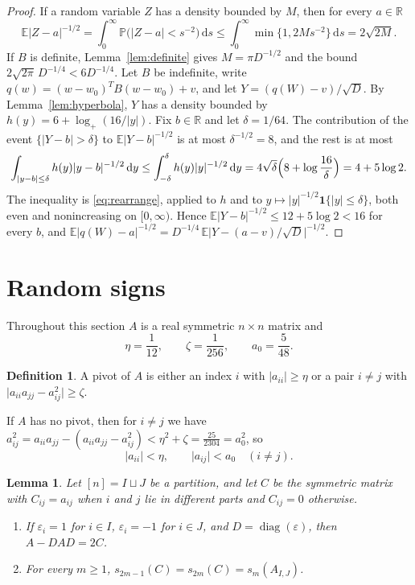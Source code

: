 \documentclass[11pt]{amsart}
\numberwithin{equation}{section}
\newtheorem{lemma}[theorem]{Lemma}
\theoremstyle{definition}
\newtheorem{definition}[theorem]{Definition}
\theoremstyle{remark}
\newcommand{\R}{\mathbb R}
\newcommand{\E}{\mathbb E}
\newcommand{\PP}{\mathbb P}
\newcommand{\1}{\mathbf 1}
\newcommand{\dd}{\,\mathrm d}
\DeclareMathOperator{\diag}{diag}
\newcommand{\logp}{\log_+}
\newcommand{\abs}[1]{\lvert #1\rvert}
\begin{document}
\begin{proof}
If a random variable $Z$ has a density bounded by $M$, then for every $a\in\R$
\begin{equation}\label{eq:boundedhalf}
\E\abs{Z-a}^{-1/2}=\int_0^\infty\PP\bigl(\abs{Z-a}<s^{-2}\bigr)\dd s\le\int_0^\infty\min\{1,2Ms^{-2}\}\dd s=2\sqrt{2M}.
\end{equation}
If $B$ is definite, Lemma~\ref{lem:definite} gives $M=\pi D^{-1/2}$ and the bound $2\sqrt{2\pi}\,D^{-1/4}<6D^{-1/4}$. Let $B$ be indefinite, write $q(w)=(w-w_0)^TB(w-w_0)+v$, and let $Y=(q(W)-v)/\sqrt D$. By Lemma~\ref{lem:hyperbola}, $Y$ has a density bounded by $h(y)=6+\logp(16/\abs y)$. Fix $b\in\R$ and let $\delta=1/64$. The contribution of the event $\{\abs{Y-b}>\delta\}$ to $\E\abs{Y-b}^{-1/2}$ is at most $\delta^{-1/2}=8$, and the rest is at most
\[
\int_{\abs{y-b}\le\delta}h(y)\abs{y-b}^{-1/2}\dd y\le\int_{-\delta}^\delta h(y)\abs y^{-1/2}\dd y=4\sqrt\delta\Bigl(8+\log\frac{16}\delta\Bigr)=4+5\log2 .
\]
The inequality is \eqref{eq:rearrange}, applied to $h$ and to $y\mapsto\abs y^{-1/2}\1\{\abs y\le\delta\}$, both even and nonincreasing on $[0,\infty)$. Hence $\E\abs{Y-b}^{-1/2}\le12+5\log2<16$ for every $b$, and $\E\abs{q(W)-a}^{-1/2}=D^{-1/4}\,\E\abs{Y-(a-v)/\sqrt D}^{-1/2}$.
\end{proof}


\section{Random signs}\label{sec:signs}

Throughout this section $A$ is a real symmetric $n\times n$ matrix and
\begin{equation}\label{eq:parameters}
\eta=\frac1{12},\qquad\zeta=\frac1{256},\qquad a_0=\frac5{48}.
\end{equation}

\begin{definition}\label{def:pivot}
A pivot of $A$ is either an index $i$ with $\abs{a_{ii}}\ge\eta$ or a pair $i\ne j$ with $\abs{a_{ii}a_{jj}-a_{ij}^2}\ge\zeta$.
\end{definition}

If $A$ has no pivot, then for $i\ne j$ we have $a_{ij}^2=a_{ii}a_{jj}-(a_{ii}a_{jj}-a_{ij}^2)<\eta^2+\zeta=\frac{25}{2304}=a_0^2$, so
\begin{equation}\label{eq:small}
\abs{a_{ii}}<\eta,\qquad\abs{a_{ij}}<a_0\quad(i\ne j).
\end{equation}

\begin{lemma}\label{lem:cross}
Let $[n]=I\sqcup J$ be a partition, and let $C$ be the symmetric matrix with $C_{ij}=a_{ij}$ when $i$ and $j$ lie in different parts and $C_{ij}=0$ otherwise.
\begin{enumerate}
\item[(a)] If $\varepsilon_i=1$ for $i\in I$, $\varepsilon_i=-1$ for $i\in J$, and $D=\diag(\varepsilon)$, then $A-DAD=2C$.
\item[(b)] For every $m\ge1$, $s_{2m-1}(C)=s_{2m}(C)=s_m(A_{I,J})$.
\end{enumerate}
\end{lemma}
\end{document}
